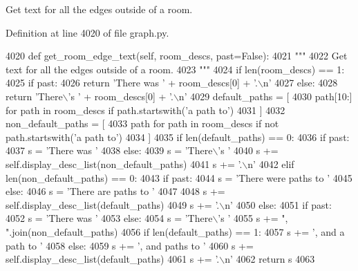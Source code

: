 \begin{DoxyVerb}Get text for all the edges outside of a room.
\end{DoxyVerb}
 

Definition at line 4020 of file graph.\+py.


\begin{DoxyCode}
4020     \textcolor{keyword}{def }get\_room\_edge\_text(self, room\_descs, past=False):
4021         \textcolor{stringliteral}{"""}
4022 \textcolor{stringliteral}{        Get text for all the edges outside of a room.}
4023 \textcolor{stringliteral}{        """}
4024         \textcolor{keywordflow}{if} len(room\_descs) == 1:
4025             \textcolor{keywordflow}{if} past:
4026                 \textcolor{keywordflow}{return} \textcolor{stringliteral}{'There was '} + room\_descs[0] + \textcolor{stringliteral}{'.\(\backslash\)n'}
4027             \textcolor{keywordflow}{else}:
4028                 \textcolor{keywordflow}{return} \textcolor{stringliteral}{'There\(\backslash\)'s '} + room\_descs[0] + \textcolor{stringliteral}{'.\(\backslash\)n'}
4029         default\_paths = [
4030             path[10:] \textcolor{keywordflow}{for} path \textcolor{keywordflow}{in} room\_descs \textcolor{keywordflow}{if} path.startswith(\textcolor{stringliteral}{'a path to'})
4031         ]
4032         non\_default\_paths = [
4033             path \textcolor{keywordflow}{for} path \textcolor{keywordflow}{in} room\_descs \textcolor{keywordflow}{if} \textcolor{keywordflow}{not} path.startswith(\textcolor{stringliteral}{'a path to'})
4034         ]
4035         \textcolor{keywordflow}{if} len(default\_paths) == 0:
4036             \textcolor{keywordflow}{if} past:
4037                 s = \textcolor{stringliteral}{'There was '}
4038             \textcolor{keywordflow}{else}:
4039                 s = \textcolor{stringliteral}{'There\(\backslash\)'s '}
4040             s += self.display\_desc\_list(non\_default\_paths)
4041             s += \textcolor{stringliteral}{'.\(\backslash\)n'}
4042         \textcolor{keywordflow}{elif} len(non\_default\_paths) == 0:
4043             \textcolor{keywordflow}{if} past:
4044                 s = \textcolor{stringliteral}{'There were paths to '}
4045             \textcolor{keywordflow}{else}:
4046                 s = \textcolor{stringliteral}{'There are paths to '}
4047 
4048             s += self.display\_desc\_list(default\_paths)
4049             s += \textcolor{stringliteral}{'.\(\backslash\)n'}
4050         \textcolor{keywordflow}{else}:
4051             \textcolor{keywordflow}{if} past:
4052                 s = \textcolor{stringliteral}{'There was '}
4053             \textcolor{keywordflow}{else}:
4054                 s = \textcolor{stringliteral}{'There\(\backslash\)'s '}
4055             s += \textcolor{stringliteral}{", "}.join(non\_default\_paths)
4056             \textcolor{keywordflow}{if} len(default\_paths) == 1:
4057                 s += \textcolor{stringliteral}{', and a path to '}
4058             \textcolor{keywordflow}{else}:
4059                 s += \textcolor{stringliteral}{', and paths to '}
4060             s += self.display\_desc\_list(default\_paths)
4061             s += \textcolor{stringliteral}{'.\(\backslash\)n'}
4062         \textcolor{keywordflow}{return} s
4063 
\end{DoxyCode}
